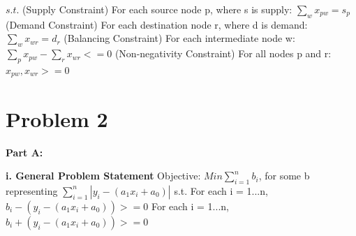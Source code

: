 \documentclass[paper=a4, fontsize=11pt]{scrartcl} %
\numberwithin{equation}{section} %
\numberwithin{figure}{section} %
\numberwithin{table}{section} %
\begin{document}
$s.t.$\newline
(Supply Constraint) For each source node p, where s is supply: $\sum_{w}{x_{pw}} = s_{p}$\newline
(Demand Constraint) For each destination node r, where d is demand: $\sum_{w}{x_{wr}} = d_{r}$\newline
(Balancing Constraint) For each intermediate node w: $\sum_{p}{x_{pw}} - \sum_{r}{x_{wr}} <= 0$\newline
(Non-negativity Constraint) For all nodes p and r: $x_{pw}, x_{wr} >= 0$\newline


\section{Problem 2}
\textbf{Part A:}

    \textbf{i. General Problem Statement}\newline
	Objective:\newline    
    $Min \sum_{i=1}^{n}{b_i}$, for some b representing $\sum_{i=1}^{n}{|y_i - (a_1x_i + a_0)|}$\newline
    s.t.\newline
    For each i = 1...n, $b_i - (y_i - (a_1x_i + a_0)) >= 0$\newline
    For each i = 1...n, $b_i + (y_i - (a_1x_i + a_0)) >= 0$\newline
    
\end{document}

